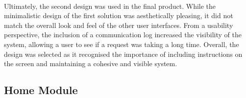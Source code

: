 		\paragraph{}{
		Ultimately, the second design was used in the final product. While the minimalistic design of the first solution was aesthetically pleasing, it did not match the overall look and feel of the other user interfaces. From a usability perspective, the inclusion of a communication log increased the visibility of the system, allowing a user to see if a request was taking a long time. Overall, the design was selected as it recognised the importance of including instructions on the screen and maintaining a cohesive and visible system.
		}

	\subsection{Home Module}
		\paragraph{}{
		
		}
